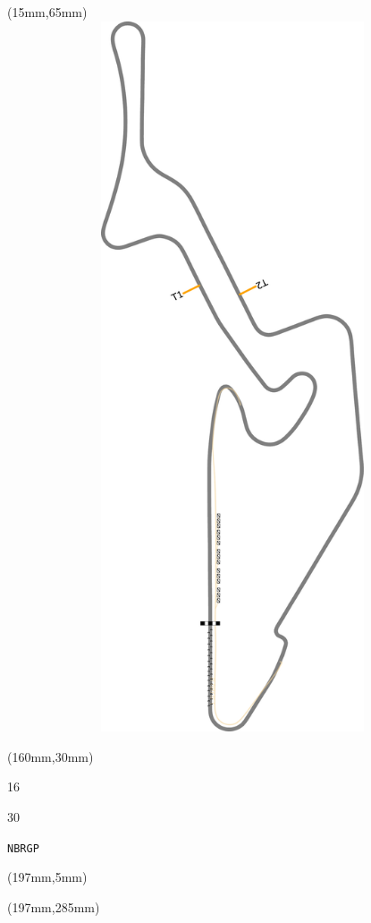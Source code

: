 \begin{textblock*}{185mm}(15mm,65mm)%
\centering
\mbox{\includegraphics[width=185mm,height=210mm,keepaspectratio]{PT/NBRGP.pdf}}
\end{textblock*}
\begin{textblock*}{40mm}(160mm,30mm)%
\Large
\par{} 
\par16 
\par30 
\par\hfill\tiny\tt NBRGP\\
\end{textblock*}
\begin{textblock*}{20mm}(197mm,5mm)%
\fbox{\thepage}
\label{NBRGP}
\end{textblock*}
\begin{textblock*}{20mm}(197mm,285mm)%
\fbox{\thepage}
\end{textblock*}

